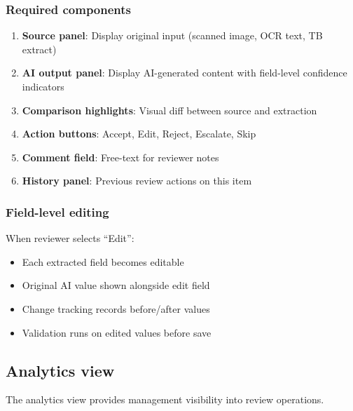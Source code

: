 \documentclass[11pt,a4paper,twoside]{report}
\begin{document}
\subsubsection{Required components}

\begin{enumerate}
\item \textbf{Source panel}: Display original input (scanned image, OCR text,
TB extract)
\item \textbf{AI output panel}: Display AI-generated content with
field-level confidence indicators
\item \textbf{Comparison highlights}: Visual diff between source and extraction
\item \textbf{Action buttons}: Accept, Edit, Reject, Escalate, Skip
\item \textbf{Comment field}: Free-text for reviewer notes
\item \textbf{History panel}: Previous review actions on this item
\end{enumerate}

\subsubsection{Field-level editing}

When reviewer selects ``Edit'':
\begin{itemize}
\item Each extracted field becomes editable
\item Original AI value shown alongside edit field
\item Change tracking records before/after values
\item Validation runs on edited values before save
\end{itemize}

\subsection{Analytics view}

The analytics view provides management visibility into review operations.
\end{document}
